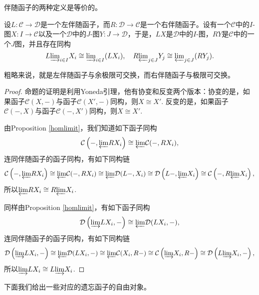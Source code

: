 \begin{pro}
伴随函子的两种定义是等价的。
\end{pro}

\begin{pro}
设$L:\mathcal{C}\to \mathcal{D}$是一个左伴随函子，而$R:\mathcal{D}\to \mathcal{C}$是一个右伴随函子。设有一个$\mathcal{C}$中的$I$-图$X:I\to \mathcal{C}$以及一个$\mathcal{D}$中的$J$-图$Y:J\to \mathcal{D}$，于是，$LX$是$\mathcal{D}$中的$I$-图，$RY$是$\mathcal{C}$中的一个$J$图，并且存在同构
\[
	L{\varinjlim}_{i\in I} X_i\cong {\varinjlim}_{i\in I} (LX_i),\quad
	R{\varprojlim}_{j\in J} Y_j\cong {\varprojlim}_{j\in J} (RY_j).
\]
\end{pro}

粗略来说，就是左伴随函子与余极限可交换，而右伴随函子与极限可交换。

\begin{proof}
	命题的证明是利用Yoneda引理，他有协变和反变两个版本：协变的是，如果函子$\mathcal{C}(X,-)$与函子$\mathcal{C}(X',-)$同构，则$X\cong X'$. 反变的是，如果函子$\mathcal{C}(-,X)$与函子$\mathcal{C}(-,X')$同构，则$X\cong X'$.

	由Proposition \ref{homlimit}，我们知道如下函子同构
	\[
	\mathcal{C}\left(-,{\varprojlim} RX_i\right)\cong {\varprojlim} \mathcal{C}(-,RX_i),
	\]
	连同伴随函子的函子同构，有如下同构链
	\[
	\mathcal{C}\left(-,{\varprojlim} RX_i\right)\cong {\varprojlim} \mathcal{C}(-,RX_i)\cong {\varprojlim} \mathcal{D}(L-,X_i)\cong \mathcal{D}\left(L-,{\varprojlim} X_i\right)\cong \mathcal{C}\left(-,R{\varprojlim} X_i\right),
	\]
	所以${\varprojlim} RX_i\cong R{\varprojlim} X_i$.

	同样由Proposition \ref{homlimit}，有如下函子同构
	\[
	\mathcal{D}\left({\varinjlim} LX_i,-\right)\cong {\varprojlim} \mathcal{D}(LX_i,-),
	\]
	连同伴随函子的函子同构，有如下同构链
	\[
	\mathcal{D}\left({\varinjlim} LX_i,-\right)\cong {\varprojlim} \mathcal{D}(LX_i,-)\cong {\varprojlim} \mathcal{C}(X_i,R-)\cong \mathcal{C}\left({\varinjlim} X_i,R-\right)\cong \mathcal{D}\left(L{\varinjlim} X_i,-\right),
	\]
	所以${\varinjlim} LX_i\cong L{\varinjlim} X_i$.
\end{proof}

下面我们给出一些对应的遗忘函子的自由对象。


